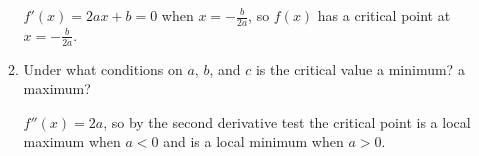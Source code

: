 \documentclass[11pt]{article}
\begin{document}
\begin{enumerate}
\begin{enumerate}
{      $f'(x) = 2ax+b = 0$ when $x=-\frac{b}{2a}$, so $f(x)$ has a
      critical point at $x=-\frac{b}{2a}$.

    }
    \vfill

  \item Under what conditions on $a$, $b$, and $c$ is the critical
    value a minimum? a maximum?
    \vfill
    {\color{blue}

      $f''(x) = 2a$, so by the second derivative test the critical
      point is a local maximum when $a < 0$ and is a local minimum
      when $a > 0$.

    }
    \vfill
  \end{enumerate}


\end{enumerate}
\end{document}
